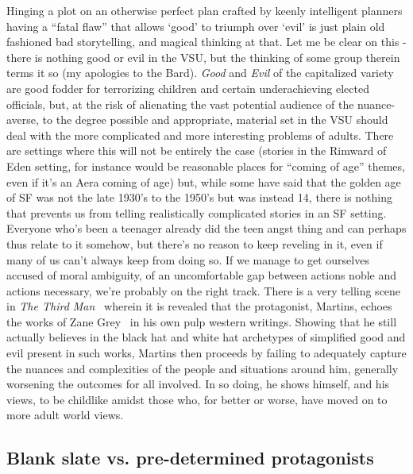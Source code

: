 Hinging a plot on an otherwise perfect plan crafted by keenly
intelligent planners having a ``fatal flaw'' that allows `good' to
triumph over `evil' is just plain old fashioned bad storytelling, and
magical thinking at that. Let me be clear on this - there is nothing
good or evil in the VSU, but the thinking of some group therein terms
it so (my apologies to the Bard).  \emph{Good} and \emph{Evil} of the
capitalized variety are good fodder for terrorizing children and
certain underachieving elected officials, but, at the risk of
alienating the vast potential audience of the nuance-averse, to the
degree possible and appropriate, material set in the VSU should deal
with the more complicated and more interesting problems of
adults. There are settings where this will not be entirely the case
(stories in the Rimward of Eden setting, for instance would be
reasonable places for ``coming of age'' themes, even if it's an Aera
coming of age) but, while some have said that the golden age of SF was
not the late 1930's to the 1950's but was instead 14, there is nothing that
prevents us from telling realistically complicated stories in an SF
setting. Everyone who's been a teenager already did the teen angst
thing and can perhaps thus relate to it somehow, but there's no reason
to keep reveling in it, even if many of us can't always keep from
doing so. If we manage to get ourselves accused of moral ambiguity, of
an uncomfortable gap between actions noble and actions necessary,
we're probably on the right track. There is a very telling scene in
\emph{The Third Man}~\cite{ThirdMan} wherein it is revealed that the
protagonist, Martins, echoes the works of Zane Grey~\cite{ZaneGrey} in
his own pulp western writings. Showing that he still actually believes
in the black hat and white hat archetypes of simplified good and evil
present in such works, Martins then proceeds by failing to adequately
capture the nuances and complexities of the people and situations
around him, generally worsening the outcomes for all involved. In so
doing, he shows himself, and his views, to be childlike amidst those
who, for better or worse, have moved on to more adult world views.

\subsection{Blank slate vs. pre-determined protagonists}

